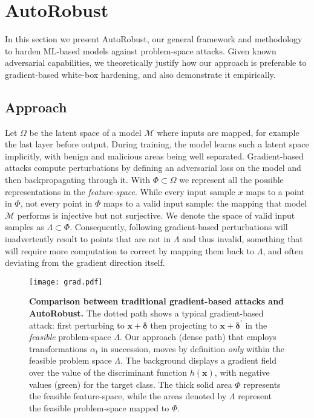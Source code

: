 \section{AutoRobust}
In this section we present AutoRobust, our general framework and methodology to harden ML-based models against problem-space attacks.
Given known adversarial capabilities, we theoretically justify how our approach is preferable to gradient-based white-box hardening, and also demonstrate it empirically.

\subsection{Approach}
Let $\Omega$ be the latent space of a model $\mathcal{M}$ where inputs are mapped, for example the last layer before output.
During training, the model learns such a latent space implicitly, with benign and malicious areas being well separated.
Gradient-based attacks compute perturbations by defining an adversarial loss on the model and then backpropagating through it.
With  $\Phi \subset \Omega$ we represent all the possible representations in the \textit{feature-space}.
While every input sample $x$ maps to a point in $\Phi$, not every point in $\Phi$ maps to a valid input sample: the mapping that model $\mathcal{M}$ performs is injective but not surjective.
We denote the space of valid input samples as $\Lambda \subset \Phi$.
Consequently, following gradient-based perturbations will inadvertently result to points that are not in $\Lambda$ and thus invalid, something that will require more computation to correct by mapping them back to $\Lambda$, and often deviating from the gradient direction itself.

\begin{figure*}[ht]
\centering
\texttt{[image: grad.pdf]}
\caption[Comparison between traditional gradient-based attacks and AutoRobust.]{\textbf{Comparison between traditional gradient-based attacks and AutoRobust.} The dotted path shows a typical gradient-based attack: first perturbing to $\mathbf{x} + \boldsymbol{\delta}$ then projecting to $\mathbf{x} + \boldsymbol{\delta}^\prime$ in the \emph{feasible} problem-space $\Lambda$. Our approach (dense path) that employs transformations $\alpha_t$ in succession, moves by definition \textit{only} within the feasible problem space $\Lambda$. The background displays a gradient field over the value of the discriminant function $h(\mathbf{x})$, with negative values (green) for the target class. The thick solid area $\Phi$ represents the feasible feature-space, while the areas denoted by $\Lambda$ represent the feasible problem-space mapped to $\Phi$.}
\label{fig:grad}
\end{figure*}


